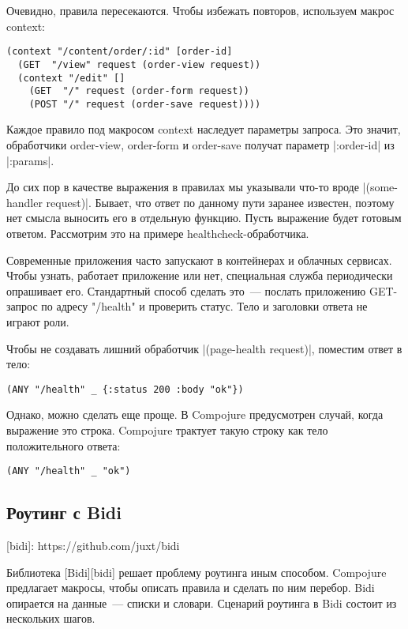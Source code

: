 Очевидно, правила пересекаются. Чтобы избежать повторов, используем макрос context:

\begin{verbatim}
(context "/content/order/:id" [order-id]
  (GET  "/view" request (order-view request))
  (context "/edit" []
    (GET  "/" request (order-form request))
    (POST "/" request (order-save request))))
\end{verbatim}

Каждое правило под макросом context наследует параметры запроса. Это значит,
обработчики order-view, order-form и order-save получат параметр \spverb|:order-id| из
\spverb|:params|.

До сих пор в качестве выражения в правилах мы указывали что-то вроде
\spverb|(some-handler request)|. Бывает, что ответ по данному пути заранее известен,
поэтому нет смысла выносить его в отдельную функцию. Пусть выражение будет
готовым ответом. Рассмотрим это на примере healthcheck-обработчика.

Современные приложения часто запускают в контейнерах и облачных сервисах.  Чтобы
узнать, работает приложение или нет, специальная служба периодически опрашивает
его. Стандартный способ сделать это~--- послать приложению GET-запрос по адресу
"/health" и проверить статус. Тело и заголовки ответа не играют роли.

Чтобы не создавать лишний обработчик \spverb|(page-health request)|, поместим ответ в
тело:

\begin{verbatim}
(ANY "/health" _ {:status 200 :body "ok"})
\end{verbatim}

Однако, можно сделать еще проще. В Compojure предусмотрен случай, когда
выражение это строка. Compojure трактует такую строку как тело положительного
ответа:

\begin{verbatim}
(ANY "/health" _ "ok")
\end{verbatim}

\subsection{Роутинг с Bidi}

[bidi]: https://github.com/juxt/bidi

Библиотека [Bidi][bidi] решает проблему роутинга иным способом. Compojure
предлагает макросы, чтобы описать правила и сделать по ним перебор. Bidi
опирается на данные~--- списки и словари. Сценарий роутинга в Bidi состоит из
нескольких шагов.

